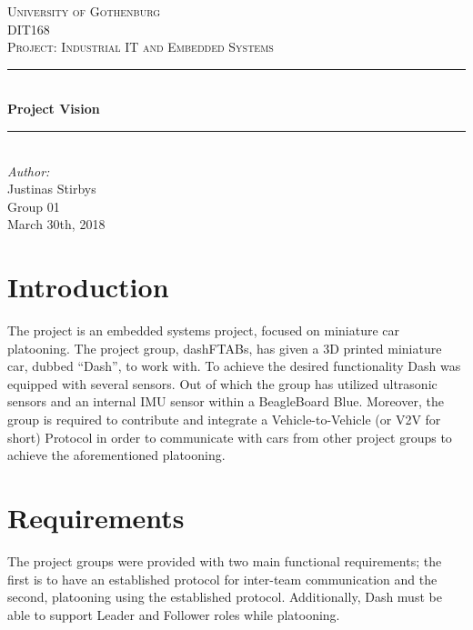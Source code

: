 \documentclass[12pt]{article}
\begin{document}
\begin{titlepage}

\newcommand{\Line}{\rule{\linewidth}{0.5mm}} 

\center
 
\textsc{\LARGE University of Gothenburg}
\\[3.5cm] 

\textsc{\Large DIT168}\\[0.3cm]
\textsc{\large Project: Industrial IT and Embedded Systems}\\[0.5cm]

\Line \\[0.4cm]
{\huge \bfseries Project Vision}\\[0.4cm]
\Line \\[0.5cm]
 
\Large \textit{Author:}
\\Justinas Stirbys \\[7cm]

{\large Group 01} \\[0.3cm]
{\large March 30th, 2018}

\vfill

\end{titlepage}


\section{Introduction} 
The project is an embedded systems project, focused on miniature car platooning. The project group, dashFTABs, has given a 3D printed miniature car, dubbed “Dash”, to work with. To achieve the desired functionality Dash was equipped with several sensors. Out of which the group has utilized ultrasonic sensors and an internal IMU sensor within a BeagleBoard Blue. Moreover, the group is required to contribute and integrate a Vehicle-to-Vehicle (or V2V for short) Protocol in order to communicate with cars from other project groups to achieve the aforementioned platooning.

\section{Requirements}
The project groups were provided with two main functional requirements; the first is to have an established protocol for inter-team communication and the second, platooning using the established protocol. Additionally, Dash must be able to support Leader and Follower roles while platooning. \par
\end{document}
